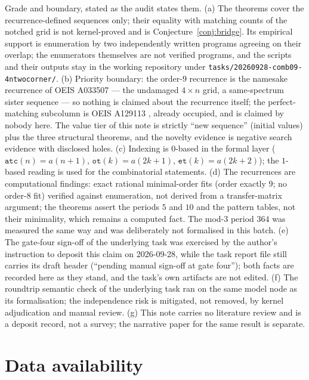 \documentclass[11pt]{article}
\theoremstyle{definition}
\begin{document}
Grade and boundary, stated as the audit states them. (a) The theorems cover the
recurrence-defined sequences only; their equality with matching counts of the
notched grid is not kernel-proved and is Conjecture~\ref{conj:bridge}. Its
empirical support is enumeration by two independently written programs agreeing
on their overlap; the enumerators themselves are not verified programs, and the
scripts and their outputs stay in the working repository under
\texttt{tasks/20260928-comb09-4ntwocorner/}. (b) Priority boundary: the
order-$9$ recurrence is the namesake recurrence of OEIS A033507
\cite{oeis-a033507} --- the undamaged $4\times n$ grid, a same-spectrum sister
sequence --- so nothing is claimed about the recurrence itself; the
perfect-matching subcolumn is OEIS A129113 \cite{oeis-a129113}, already
occupied, and is claimed by nobody here. The value tier of this note is
strictly ``new sequence'' (initial values) plus the three structural theorems,
and the novelty evidence is negative search evidence with disclosed holes. (c)
Indexing is $0$-based in the formal layer ($\texttt{atc}(n) = a(n+1)$,
$\texttt{ot}(k) = a(2k+1)$, $\texttt{et}(k) = a(2k+2)$); the $1$-based reading
is used for the combinatorial statements. (d) The recurrences are computational
findings: exact rational minimal-order fits (order exactly $9$; no order-$8$
fit) verified against enumeration, not derived from a transfer-matrix argument;
the theorems assert the periods $5$ and $10$ and the pattern tables, not their
minimality, which remains a computed fact. The mod-$3$ period $364$ was
measured the same way and was deliberately not formalised in this batch. (e)
The gate-four sign-off of the underlying task was exercised by the author's
instruction to deposit this claim on 2026-09-28, while the task report file
still carries its draft header (``pending manual sign-off at gate four''); both
facts are recorded here as they stand, and the task's own artifacts are not
edited. (f) The roundtrip semantic check of the underlying task ran on the same
model node as its formalisation; the independence risk is mitigated, not
removed, by kernel adjudication and manual review. (g) This note carries no
literature review and is a deposit record, not a survey; the narrative paper for
the same result is separate.

\section*{Data availability}
\end{document}

